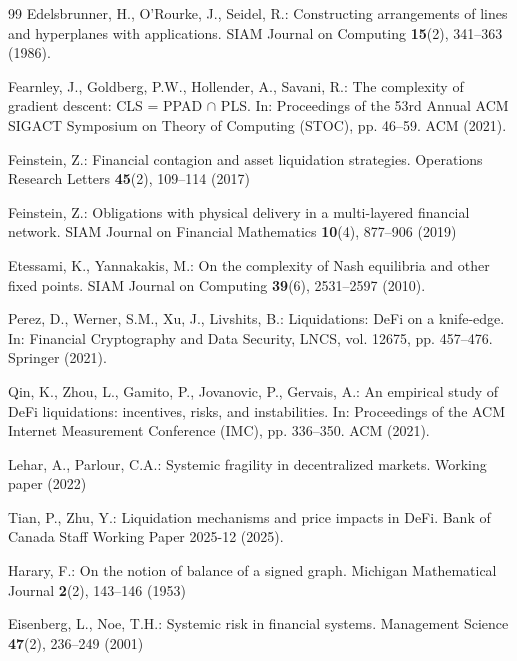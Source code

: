 \documentclass{llncs}
\begin{document}
\begin{thebibliography}{99}
Edelsbrunner, H., O'Rourke, J., Seidel, R.:
Constructing arrangements of lines and hyperplanes with applications.
SIAM Journal on Computing \textbf{15}(2), 341--363 (1986). 

Fearnley, J., Goldberg, P.W., Hollender, A., Savani, R.:
The complexity of gradient descent: CLS = PPAD $\cap$ PLS.
In: Proceedings of the 53rd Annual ACM SIGACT Symposium on Theory of Computing (STOC), pp. 46--59. ACM (2021). 

Feinstein, Z.:
Financial contagion and asset liquidation strategies.
Operations Research Letters \textbf{45}(2), 109--114 (2017)

Feinstein, Z.:
Obligations with physical delivery in a multi-layered financial network.
SIAM Journal on Financial Mathematics \textbf{10}(4), 877--906 (2019)

Etessami, K., Yannakakis, M.:
On the complexity of Nash equilibria and other fixed points.
SIAM Journal on Computing \textbf{39}(6), 2531--2597 (2010). 

Perez, D., Werner, S.M., Xu, J., Livshits, B.:
Liquidations: DeFi on a knife-edge.
In: Financial Cryptography and Data Security, LNCS, vol. 12675, pp. 457--476. Springer (2021). 

Qin, K., Zhou, L., Gamito, P., Jovanovic, P., Gervais, A.:
An empirical study of DeFi liquidations: incentives, risks, and instabilities.
In: Proceedings of the ACM Internet Measurement Conference (IMC), pp. 336--350. ACM (2021). 

Lehar, A., Parlour, C.A.:
Systemic fragility in decentralized markets.
Working paper (2022)

Tian, P., Zhu, Y.:
Liquidation mechanisms and price impacts in DeFi.
Bank of Canada Staff Working Paper 2025-12 (2025). 

Harary, F.:
On the notion of balance of a signed graph.
Michigan Mathematical Journal \textbf{2}(2), 143--146 (1953)

Eisenberg, L., Noe, T.H.:
Systemic risk in financial systems.
Management Science \textbf{47}(2), 236--249 (2001)


\end{thebibliography}
\end{document}
